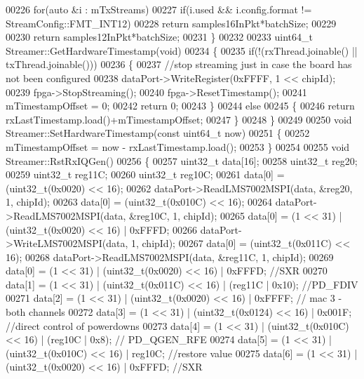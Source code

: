 \begin{DoxyCode}
00226     \textcolor{keywordflow}{for}(\textcolor{keyword}{auto} &i : mTxStreams)
00227         \textcolor{keywordflow}{if}(i.used && i.config.format != StreamConfig::FMT_INT12)
00228             \textcolor{keywordflow}{return} samples16InPkt*batchSize;
00229 
00230     \textcolor{keywordflow}{return} samples12InPkt*batchSize;
00231 \}
00232 
00233 uint64\_t Streamer::GetHardwareTimestamp(\textcolor{keywordtype}{void})
00234 \{
00235     \textcolor{keywordflow}{if}(!(rxThread.joinable() || txThread.joinable()))
00236     \{
00237         \textcolor{comment}{//stop streaming just in case the board has not been configured}
00238         dataPort->WriteRegister(0xFFFF, 1 << chipId);
00239         fpga->StopStreaming();
00240         fpga->ResetTimestamp();
00241         mTimestampOffset = 0;
00242         \textcolor{keywordflow}{return} 0;
00243     \}
00244     \textcolor{keywordflow}{else}
00245     \{
00246         \textcolor{keywordflow}{return} rxLastTimestamp.load()+mTimestampOffset;
00247     \}
00248 \}
00249 
00250 \textcolor{keywordtype}{void} Streamer::SetHardwareTimestamp(\textcolor{keyword}{const} uint64\_t now)
00251 \{
00252     mTimestampOffset = now - rxLastTimestamp.load();
00253 \}
00254 
00255 \textcolor{keywordtype}{void} Streamer::RstRxIQGen()
00256 \{
00257     uint32\_t data[16];
00258     uint32\_t reg20;
00259     uint32\_t reg11C;
00260     uint32\_t reg10C;
00261     data[0] = (uint32\_t(0x0020) << 16);
00262     dataPort->ReadLMS7002MSPI(data, &reg20, 1, chipId);
00263     data[0] = (uint32\_t(0x010C) << 16);
00264     dataPort->ReadLMS7002MSPI(data, &reg10C, 1, chipId);
00265     data[0] = (1 << 31) | (uint32\_t(0x0020) << 16) | 0xFFFD;
00266     dataPort->WriteLMS7002MSPI(data, 1, chipId);
00267     data[0] = (uint32\_t(0x011C) << 16);
00268     dataPort->ReadLMS7002MSPI(data, &reg11C, 1, chipId);
00269     data[0] = (1 << 31) | (uint32\_t(0x0020) << 16) | 0xFFFD;             \textcolor{comment}{//SXR}
00270     data[1] = (1 << 31) | (uint32\_t(0x011C) << 16) | (reg11C | 0x10);    \textcolor{comment}{//PD\_FDIV}
00271     data[2] = (1 << 31) | (uint32\_t(0x0020) << 16) | 0xFFFF;             \textcolor{comment}{// mac 3 - both channels}
00272     data[3] = (1 << 31) | (uint32\_t(0x0124) << 16) | 0x001F;             \textcolor{comment}{//direct control of powerdowns}
00273     data[4] = (1 << 31) | (uint32\_t(0x010C) << 16) | (reg10C | 0x8);     \textcolor{comment}{// PD\_QGEN\_RFE}
00274     data[5] = (1 << 31) | (uint32\_t(0x010C) << 16) | reg10C;             \textcolor{comment}{//restore value}
00275     data[6] = (1 << 31) | (uint32\_t(0x0020) << 16) | 0xFFFD;             \textcolor{comment}{//SXR}

\end{DoxyCode}
